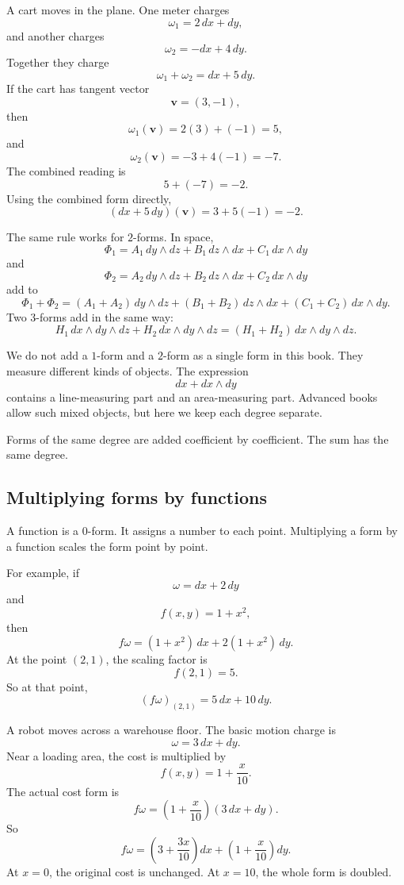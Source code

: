 \begin{example}
A cart moves in the plane.  One meter charges
\[
    \omega_1=2\,dx+dy,
\]
and another charges
\[
    \omega_2=-dx+4\,dy.
\]
Together they charge
\[
    \omega_1+\omega_2=dx+5\,dy.
\]
If the cart has tangent vector
\[
    \mathbf v=(3,-1),
\]
then
\[
    \omega_1(\mathbf v)=2(3)+(-1)=5,
\]
and
\[
    \omega_2(\mathbf v)=-3+4(-1)=-7.
\]
The combined reading is
\[
    5+(-7)=-2.
\]
Using the combined form directly,
\[
    (dx+5\,dy)(\mathbf v)=3+5(-1)=-2.
\]
\end{example}

The same rule works for \(2\)-forms.  In space,
\[
    \Phi_1=A_1\,dy\wedge dz+B_1\,dz\wedge dx+C_1\,dx\wedge dy
\]
and
\[
    \Phi_2=A_2\,dy\wedge dz+B_2\,dz\wedge dx+C_2\,dx\wedge dy
\]
add to
\[
\boxed{
    \Phi_1+\Phi_2
    =
    (A_1+A_2)\,dy\wedge dz
    +(B_1+B_2)\,dz\wedge dx
    +(C_1+C_2)\,dx\wedge dy.
}
\]
Two \(3\)-forms add in the same way:
\[
    H_1\,dx\wedge dy\wedge dz
    +
    H_2\,dx\wedge dy\wedge dz
    =
    (H_1+H_2)\,dx\wedge dy\wedge dz.
\]

We do not add a \(1\)-form and a \(2\)-form as a single form in this book.  They measure
different kinds of objects.  The expression
\[
    dx+dx\wedge dy
\]
contains a line-measuring part and an area-measuring part.  Advanced books allow such
mixed objects, but here we keep each degree separate.

\begin{definition}
Forms of the same degree are added coefficient by coefficient.  The sum has the same
degree.
\end{definition}

\subsection{Multiplying forms by functions}

A function is a \(0\)-form.  It assigns a number to each point.  Multiplying a form by a
function scales the form point by point.

For example, if
\[
    \omega=dx+2\,dy
\]
and
\[
    f(x,y)=1+x^2,
\]
then
\[
\boxed{
    f\omega=(1+x^2)\,dx+2(1+x^2)\,dy.
}
\]
At the point \((2,1)\), the scaling factor is
\[
    f(2,1)=5.
\]
So at that point,
\[
    (f\omega)_{(2,1)}=5\,dx+10\,dy.
\]

\begin{example}
A robot moves across a warehouse floor.  The basic motion charge is
\[
    \omega=3\,dx+dy.
\]
Near a loading area, the cost is multiplied by
\[
    f(x,y)=1+\frac{x}{10}.
\]
The actual cost form is
\[
    f\omega
    =
    \left(1+\frac{x}{10}\right)(3\,dx+dy).
\]
So
\[
    f\omega
    =
    \left(3+\frac{3x}{10}\right)dx
    +
    \left(1+\frac{x}{10}\right)dy.
\]
At \(x=0\), the original cost is unchanged.  At \(x=10\), the whole form is doubled.
\end{example}

